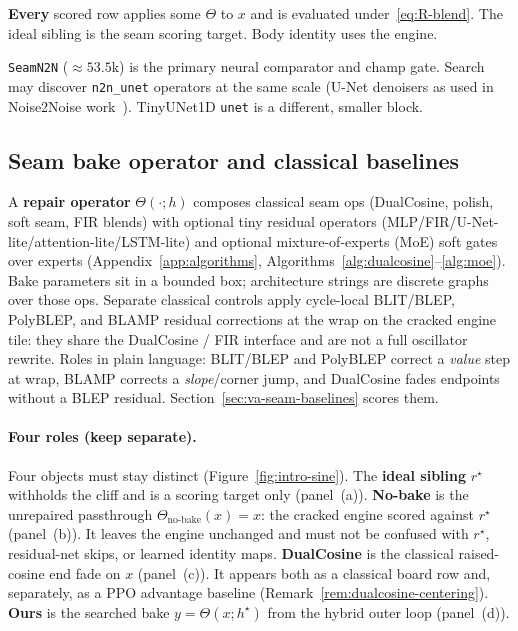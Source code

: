 \textbf{Every} scored row applies some $\Theta$ to $x$ and is evaluated under~\eqref{eq:R-blend}.
The ideal sibling is the seam scoring target. Body identity uses the engine.

\begin{remark}
\label{rem:n2n}
\texttt{SeamN2N} (${\approx}53.5$k) is the primary neural comparator and champ gate.
Search may discover \texttt{n2n\_unet} operators at the same scale (U-Net denoisers as used in Noise2Noise work~\citep{lehtinen2018,kashyap2021n2n}). TinyUNet1D \texttt{unet} is a different, smaller block.
\end{remark}

\subsection{Seam bake operator and classical baselines}
\label{sec:bake}

A \textbf{repair operator} $\Theta(\cdot;h)$ composes classical seam ops (DualCosine, polish, soft seam, FIR blends) with optional tiny residual operators (MLP/FIR/U-Net-lite/attention-lite/LSTM-lite) and optional mixture-of-experts (MoE) soft gates over experts (Appendix~\ref{app:algorithms}, Algorithms~\ref{alg:dualcosine}--\ref{alg:moe}).
Bake parameters sit in a bounded box; architecture strings are discrete graphs over those ops.
Separate classical controls apply cycle-local BLIT/BLEP, PolyBLEP, and BLAMP residual corrections at the wrap on the cracked engine tile: they share the DualCosine / FIR interface and are not a full oscillator rewrite.
Roles in plain language: BLIT/BLEP and PolyBLEP correct a \emph{value} step at wrap, BLAMP corrects a \emph{slope}/corner jump, and DualCosine fades endpoints without a BLEP residual.
Section~\ref{sec:va-seam-baselines} scores them.

\paragraph{Four roles (keep separate).}
\label{sec:four-roles}
Four objects must stay distinct (Figure~\ref{fig:intro-sine}).
The \textbf{ideal sibling} $r^{\star}$ withholds the cliff and is a scoring target only (panel~(a)).
\textbf{No-bake} is the unrepaired passthrough $\Theta_{\mathrm{no\text{-}bake}}(x)=x$: the cracked engine scored against $r^{\star}$ (panel~(b)).
It leaves the engine unchanged and must not be confused with $r^{\star}$, residual-net skips, or learned identity maps.
\textbf{DualCosine} is the classical raised-cosine end fade on $x$ (panel~(c)).
It appears both as a classical board row and, separately, as a PPO advantage baseline (Remark~\ref{rem:dualcosine-centering}).
\textbf{Ours} is the searched bake $y=\Theta(x;h^{\star})$ from the hybrid outer loop (panel~(d)).

